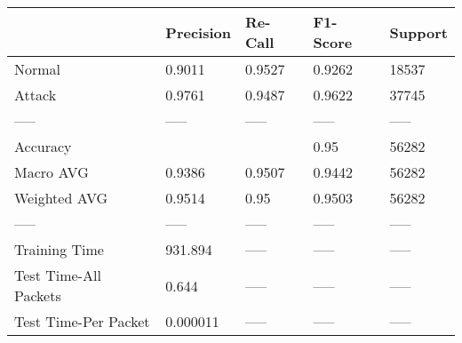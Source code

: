 \begin{tabular}{lllll}
\toprule
{} & Precision & Re-Call & F1-Score & Support \\
\midrule
Normal                &    0.9011 &  0.9527 &   0.9262 &   18537 \\
Attack                &    0.9761 &  0.9487 &   0.9622 &   37745 \\
-----                 &     ----- &   ----- &    ----- &   ----- \\
Accuracy              &           &         &     0.95 &   56282 \\
Macro AVG             &    0.9386 &  0.9507 &   0.9442 &   56282 \\
Weighted AVG          &    0.9514 &    0.95 &   0.9503 &   56282 \\
-----                 &     ----- &   ----- &    ----- &   ----- \\
Training Time         &   931.894 &   ----- &    ----- &   ----- \\
Test Time-All Packets &     0.644 &   ----- &    ----- &   ----- \\
Test Time-Per Packet  &  0.000011 &   ----- &    ----- &   ----- \\
\bottomrule
\end{tabular}

